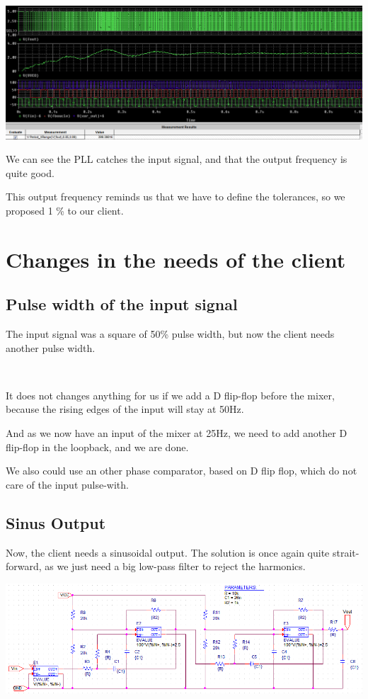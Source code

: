 \documentclass{article}
\begin{document}
\includegraphics[width=15cm]{pll_first.png}

We can see the PLL catches the input signal, and that the output frequency is quite good.

This output frequency reminds us that we have to define the tolerances, so we proposed 1 \% to our client.


\section{Changes in the needs of the client}

\subsection{Pulse width of the input signal}

The input signal was a square of 50\% pulse width, but now the client needs another pulse width.

~

It does not changes anything for us if we add a D flip-flop before the mixer, because the rising edges of the input will stay at 50Hz.

And as we now have an input of the mixer at 25Hz, we need to add another D flip-flop in the loopback, and we are done.

We also could use an other phase comparator, based on D flip flop, which do not care of the input pulse-with.

\subsection{Sinus Output}

Now, the client needs a sinusoidal output. The solution is once again quite strait-forward, as we just need a big low-pass filter to reject the harmonics.

\includegraphics[width=15cm]{filtre_sortie.png}
\end{document}
